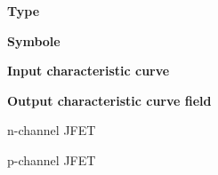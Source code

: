 {%
\begin{table}[H]
    \renewcommand{\tablename}{Table}
    \begin{figure}[H]
        \begin{minipage}[c]{0.2\textwidth}
            \centering
            \textbf{Type}
        \end{minipage}
        \begin{minipage}[c]{0.15\textwidth}
            \centering
            \textbf{Symbole}
        \end{minipage}
        \begin{minipage}[c]{0.3\textwidth}
            \centering
            \textbf{Input characteristic curve}
        \end{minipage}
        \begin{minipage}[c]{0.3\textwidth}
            \centering
            \textbf{Output characteristic curve field}
        \end{minipage}
    \end{figure}
    \begin{figure}[H]
        \begin{minipage}[c]{0.2\textwidth}
        \centering
        n-channel JFET
        \end{minipage}
        \begin{minipage}[c]{0.15\textwidth}
            \centering
            
            \end{minipage}
        \begin{minipage}[c]{0.3\textwidth}
        \centering
          
        \end{minipage}
        \begin{minipage}[c]{0.3\textwidth}
        \centering
        
        \end{minipage}
    \end{figure}
    \begin{figure}[H]
        \begin{minipage}[c]{0.2\textwidth}
        \centering
        p-channel JFET
        \end{minipage}
        \begin{minipage}[c]{0.15\textwidth}
        \centering
        
        \end{minipage}

\end{figure}
\end{table}}
